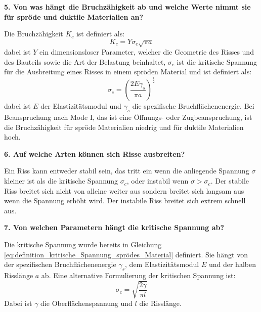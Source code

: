 \noindent\textbf{5. Von was hängt die Bruchzähigkeit ab und welche Werte nimmt sie für spröde und duktile Materialien an?}\\
\begin{addmargin}[25pt]{0pt}
Die Bruchzähigkeit $K_c$ ist definiert als:
\begin{equation}\label{eq:definition_Bruchzähigkeit}
    K_c = Y\sigma_c \sqrt{\pi a}
\end{equation}
dabei ist $Y$ ein dimensionsloser Parameter, welcher die Geometrie des Risses und des Bauteils sowie die Art der Belastung beinhaltet, $\sigma_c$ ist die kritische Spannung für die Ausbreitung eines Risses in einem spröden Material und ist definiert als:
\begin{equation}\label{eq:definition_kritische_Spannung_sprödes_Material}
    \sigma_c = \left( \frac{2E\gamma_s}{\pi a}\right)^\frac{1}{2}
\end{equation}
dabei ist $E$ der Elastizitätsmodul und $\gamma_s$ die spezifische Bruchflächenenergie. Bei Beanspruchung nach Mode I, das ist eine Öffnungs- oder Zugbeanspruchung, ist die Bruchzähigkeit für spröde Materialien niedrig und für duktile Materialien hoch.\\
\end{addmargin}

\noindent\textbf{6. Auf welche Arten können sich Risse ausbreiten?}\\
\begin{addmargin}[25pt]{0pt}
Ein Riss kann entweder stabil sein, das tritt ein wenn die anliegende Spannung $\sigma$ kleiner ist als die kritische Spannung $\sigma_c$, oder instabil wenn $\sigma > \sigma_c$. Der stabile Riss breitet sich nicht von alleine weiter aus sondern breitet sich langsam aus wenn die Spannung erhöht wird. Der instabile Riss breitet sich extrem schnell aus.\\
\end{addmargin}

\noindent\textbf{7. Von welchen Parametern hängt die kritische Spannung ab?}\\
\begin{addmargin}[25pt]{0pt}
Die kritische Spannung wurde bereits in Gleichung \ref{eq:definition_kritische_Spannung_sprödes_Material} definiert. Sie hängt von der spezifischen Bruchflächenenergie $\gamma_s$, dem Elastizitätsmodul $E$ und der halben Risslänge $a$ ab. Eine alternative Formulierung der kritischen Spannung ist:
\begin{equation}\label{eq:kritische_Spannung_alternativ}
    \sigma_c = \sqrt{\frac{2\gamma}{\pi l }}
\end{equation}
Dabei ist $\gamma$ die Oberflächenspannung und $l$ die Risslänge.\\
\end{addmargin}

